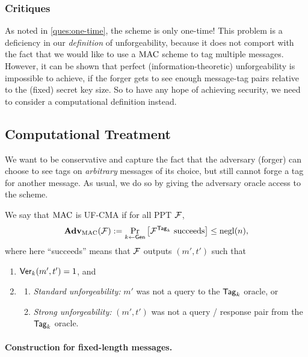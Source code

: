 \documentclass[11pt]{article}
\begin{document}
\subsubsection{Critiques}
\label{sec:critiques-info-mac}

As noted in \cref{ques:one-time}, the scheme is only one-time!
This problem is a deficiency in our \emph{definition} of
unforgeability, because it does not comport with the fact that we
would like to use a $\text{MAC}$ scheme to tag multiple messages.  However,
it can be shown that perfect (information-theoretic) unforgeability is
impossible to achieve, if the forger gets to see enough message-tag
pairs relative to the (fixed) secret key size.  So to have any hope of
achieving security, we need to consider a computational definition
instead.

\subsection{Computational Treatment}
\label{sec:comp-mac}

We want to be conservative and capture the fact that the adversary
(forger) can choose to see tags on \emph{arbitrary} messages of its
choice, but still cannot forge a tag for another message.  As usual,
we do so by giving the adversary oracle access to the scheme.

\begin{definition}
  \label{def:uf-mca}
  We say that $\text{MAC}$ is UF-CMA if for all PPT $\mathcal{F}$,
  \[
  \mathbf{Adv}_{\text{MAC}}(\mathcal{F}) := \Pr_{k \gets \mathsf{Gen}}\left[\mathcal{F}^{\mathsf{Tag}_k}
  \text{ succeeds} \right] \leq \operatorname{negl}(n),
  \]
  where here ``succeeds'' means that $\mathcal{F}$ outputs $(m',t')$ such that
  \begin{enumerate}
  \item $\mathsf{Ver}_k(m',t') = 1$, and
  \item 
    \begin{enumerate}
    \item \emph{Standard unforgeability:} $m'$ was not a query to the
      $\mathsf{Tag}_{k}$ oracle, or
    \item \emph{Strong unforgeability:} $(m',t')$ was not a query /
      response pair from the $\mathsf{Tag}_{k}$ oracle.
    \end{enumerate}
  \end{enumerate}
\end{definition}

\paragraph{Construction for fixed-length messages.}
\end{document}
